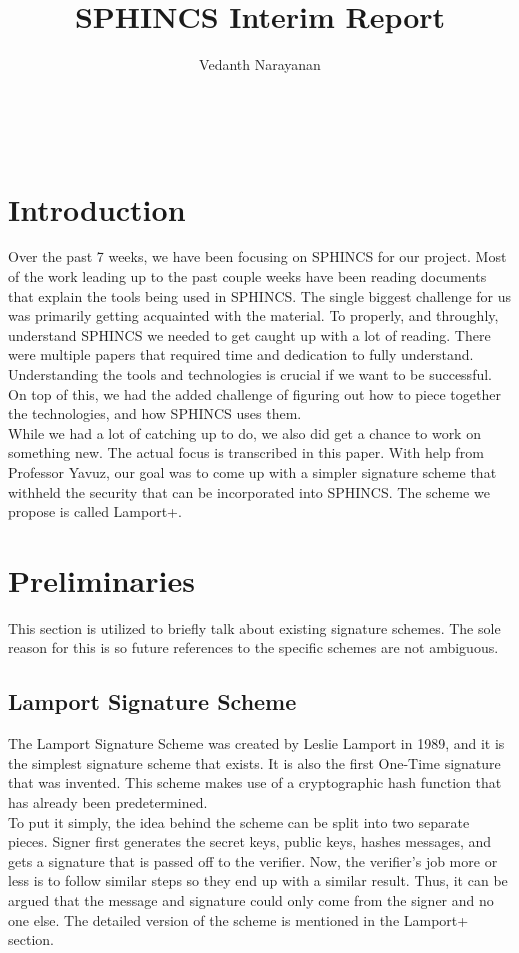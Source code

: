 \documentclass[]{scrartcl}
\title{SPHINCS Interim Report}
\author{Vedanth Narayanan}
\makeatletter
\renewcommand{\maketitle}{ %
	\begin{center} %
		{\LARGE\@title} %
		
		\vspace{15pt} %
		{\large\@author} %
		\\\@date %
		
	\end{center}
}
\makeatother
\begin{document}
\maketitle


\section*{Introduction}
Over the past 7 weeks, we have been focusing on SPHINCS for our project. Most of the work leading up to the past couple weeks have been reading documents that explain the tools being used in SPHINCS. The single biggest challenge for us was primarily getting acquainted with the material. To properly, and throughly, understand SPHINCS we needed to get caught up with a lot of reading. There were multiple papers that required time and dedication to fully understand. Understanding the tools and technologies is crucial if we want to be successful. On top of this, we had the added challenge of figuring out how to piece together the technologies, and how SPHINCS uses them.\\
While we had a lot of catching up to do, we also did get a chance to work on something new. The actual focus is transcribed in this paper. With help from Professor Yavuz, our goal was to come up with a simpler signature scheme that withheld the security that can be incorporated into SPHINCS. The scheme we propose is called Lamport+.

\section*{Preliminaries}
\vspace{-0.3cm}This section is utilized to briefly talk about existing signature schemes. The sole reason for this is so future references to the specific schemes are not ambiguous. 

\subsection*{Lamport Signature Scheme}
The Lamport Signature Scheme was created by Leslie Lamport in 1989, and it is the simplest signature scheme that exists. It is also the first One-Time signature that was invented. This scheme makes use of a cryptographic hash function that has already been predetermined.\\
To put it simply, the idea behind the scheme can be split into two separate pieces. Signer first generates the secret keys, public keys, hashes messages, and gets a signature that is passed off to the verifier. Now, the verifier's job more or less is to follow similar steps so they end up with a similar result. Thus, it can be argued that the message and signature could only come from the signer and no one else. The detailed version of the scheme is mentioned in the Lamport+ section.
\end{document}
